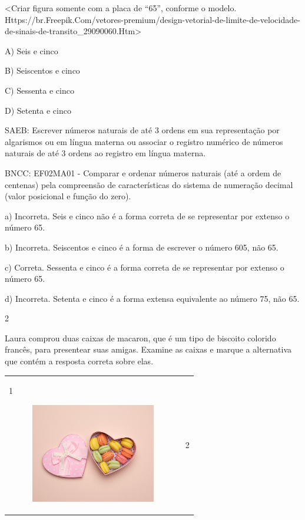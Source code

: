 \begin{escolha}
\begin{escolha}
{{{{{{{{\textless{}Criar figura somente com a placa de ``65'', conforme o
modelo.
Https://br.Freepik.Com/vetores-premium/design-vetorial-de-limite-de-velocidade-de-sinais-de-transito\_29090060.Htm\textgreater{}

A) Seis e cinco

B) Seiscentos e cinco

C) Sessenta e cinco

D) Setenta e cinco

SAEB: Escrever números naturais de até 3 ordens em sua
representação por algarismos ou em língua materna ou associar o registro
numérico de números naturais de até 3 ordens ao registro em língua
materna.

BNCC: EF02MA01 - Comparar e ordenar números naturais (até a ordem de
centenas) pela compreensão de características do sistema de numeração
decimal (valor posicional e função do zero).

a) Incorreta. Seis e cinco não é a forma correta de se representar por
extenso o número 65.

b) Incorreta. Seiscentos e cinco é a forma de escrever o número 605, não 65.

c) Correta. Sessenta e cinco é a forma correta de se representar por
extenso o número 65.

d) Incorreta. Setenta e cinco é a forma extensa equivalente ao número 75, não 65.

\num{2}

Laura comprou duas caixas de macaron, que é um tipo de biscoito colorido
francês, para presentear suas amigas. Examine as caixas e marque a
alternativa que contém a resposta correta sobre elas.

\begin{longtable}[]{@{}ll@{}}
\toprule
\begin{minipage}[t]{0.48\columnwidth}\raggedright\strut
1

\includegraphics[width=2.97774in,height=1.70540in]{media/image163.png}\strut
\end{minipage} & \begin{minipage}[t]{0.48\columnwidth}\raggedright\strut
2


\end{minipage}
\end{longtable}}}}}}}}}
\end{escolha}
\end{escolha}
